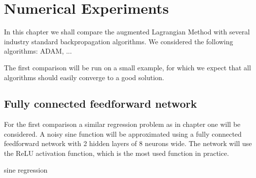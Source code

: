 \chapter{Numerical Experiments}
\label{cha:3}
In this chapter we shall compare the augmented Lagrangian Method with several industry standard backpropagation algorithms. We considered the following algorithms: ADAM, ...

The first comparison will be run on a small example, for which we expect that all algorithms should easily converge to a good solution.


\section{Fully connected feedforward network}
For the first comparison a similar regression problem as in chapter one will be considered. A noisy sine function will be approximated using a fully connected feedforward network with 2 hidden layers of 8 neurons wide. The network will use the ReLU activation function, which is the most used function in practice.

sine regression






